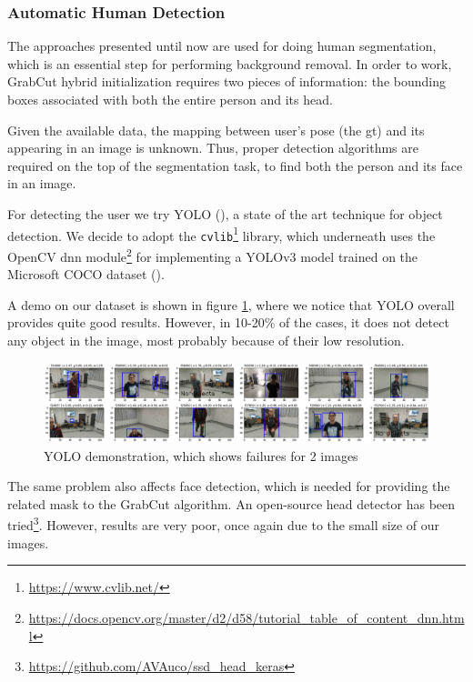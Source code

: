 \subsubsection{Automatic Human Detection}
\label{subsec:masking-yolo}

The approaches presented until now are used for doing human segmentation, which is an essential step for performing background removal. In order to work, GrabCut hybrid initialization requires two pieces of information: the bounding boxes associated with both the entire person and its head.

Given the available data, the mapping between user's pose (the \gls{gt}) and its appearing in an image is unknown. Thus, proper detection algorithms are required on the top of the segmentation task, to find both the person and its face in an image.

\medskip

For detecting the user we try YOLO (\cite{redmon2016look}), a state of the art technique for object detection. We decide to adopt the \texttt{cvlib}\footnote{\url{https://www.cvlib.net/}} library, which underneath uses the OpenCV dnn module\footnote{\url{https://docs.opencv.org/master/d2/d58/tutorial_table_of_content_dnn.html}} for implementing a YOLOv3 model trained on the Microsoft COCO dataset (\cite{lin2015microsoft}).

A demo on our dataset is shown in figure \ref{fig:yolo}, where we notice that YOLO overall provides quite good results. However, in 10-20\% of the cases, it does not detect any object in the image, most probably because of their low resolution.

\begin{figure}[!h]
	\centering
	\includegraphics[width=1\textwidth]{"contents/images/04-3yolo"}
	\caption[YOLO demonstration, which shows failures for 2 images]{YOLO demonstration, which shows failures for 2 images}
	\label{fig:yolo}
\end{figure}

The same problem also affects face detection, which is needed for providing the related mask to the GrabCut algorithm. An open-source head detector has been tried\footnote{\url{https://github.com/AVAuco/ssd_head_keras}}. However, results are very poor, once again due to the small size of our images.

